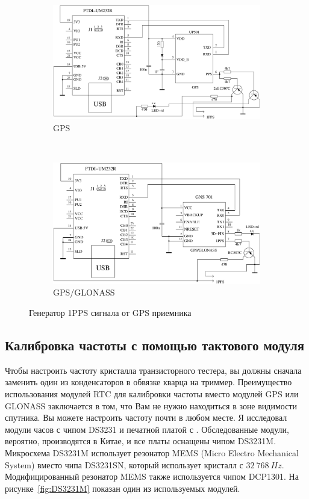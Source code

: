 \begin{figure}[H]
  \begin{subfigure}[b]{.5\textwidth}
    \centering
    \includegraphics[width=.95\textwidth]{../FIG/GPS_UP501.pdf}
    \caption{GPS}
  \end{subfigure}
  ~
  \begin{subfigure}[b]{.5\textwidth}
    \centering
    \includegraphics[width=.95\textwidth]{../FIG/GPS_GNS701.pdf}
    \caption{GPS/GLONASS}
  \end{subfigure}
  \caption{Генератор 1PPS сигнала от GPS приемника}
  \label{fig:GPS-1PPS}
\end{figure}

\subsection{Калибровка частоты с помощью тактового модуля}

Чтобы настроить частоту кристалла транзисторного тестера, вы должны сначала заменить один из
конденсаторов в обвязке кварца на триммер. Преимущество использования модулей RTC для калибровки
частоты вместо модулей GPS или GLONASS заключается в том, что Вам не нужно находиться в зоне
видимости спутника.
Вы можете настроить частоту почти в любом месте.
Я исследовал модули часов с чипом DS3231 и печатной платой с .
Обследованные модули, вероятно, производятся в Китае, и все платы оснащены чипом DS3231M.
Микросхема DS3231M использует резонатор MEMS (Micro Electro Mechanical System) вместо
чипа DS3231SN, который использует кристалл с \(32~768~Hz\).
Модифицированный резонатор MEMS также используется чипом DCP1301.
На рисунке~\ref{fig:DS3231M} показан один из используемых модулей.

